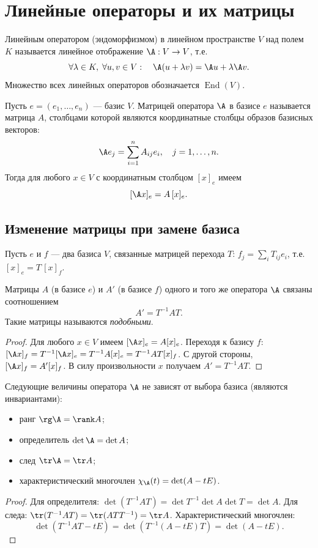 \documentclass[10pt]{article}
\begin{document}
\section{Линейные операторы и их матрицы}

\begin{definition}
    Линейным оператором (эндоморфизмом) в линейном пространстве $V$ над полем $K$ называется линейное отображение $\A: V \to V$, т.е.
    \[
    \forall \lambda\in K,\; \forall u,v\in V:\quad \A(u+\lambda v)=\A u+\lambda\A v.
    \]
    Множество всех линейных операторов обозначается $\operatorname{End}(V)$.
\end{definition}

\begin{definition}
    Пусть $e=(e_1,\dots,e_n)$ --- базис $V$. Матрицей оператора $\A$ в базисе $e$ называется матрица $A$, столбцами которой являются координатные столбцы образов базисных векторов:
    \[
    \A e_j = \sum_{i=1}^n A_{ij} e_i,\quad j=1,\dots,n.
    \]
    Тогда для любого $x\in V$ с координатным столбцом $[x]_e$ имеем
    \[
    [\A x]_e = A\,[x]_e.
    \]
\end{definition}

\subsection{Изменение матрицы при замене базиса}

Пусть $e$ и $f$ --- два базиса $V$, связанные матрицей перехода $T$: $f_j = \sum_i T_{ij} e_i$, т.е. $[x]_e = T\,[x]_f$.

\begin{theorem}
    Матрицы $A$ (в базисе $e$) и $A'$ (в базисе $f$) одного и того же оператора $\A$ связаны соотношением
    \[
    A' = T^{-1} A T.
    \]
    Такие матрицы называются \textit{подобными}.
\end{theorem}
\begin{proof}
    Для любого $x\in V$ имеем $[\A x]_e = A [x]_e$. Переходя к базису $f$:
    $[\A x]_f = T^{-1} [\A x]_e = T^{-1} A [x]_e = T^{-1} A T [x]_f$.
    С другой стороны, $[\A x]_f = A' [x]_f$. В силу произвольности $x$ получаем $A' = T^{-1} A T$.
\end{proof}

\begin{corollary}
    Следующие величины оператора $\A$ не зависят от выбора базиса (являются инвариантами):
    \begin{itemize}
        \item ранг $\rg\A = \rank A$;
        \item определитель $\det\A = \det A$;
        \item след $\tr\A = \tr A$;
        \item характеристический многочлен $\chi_\A(t) = \det(A - tE)$.
    \end{itemize}
\end{corollary}
\begin{proof}
    Для определителя: $\det(T^{-1}AT)=\det T^{-1}\det A\det T = \det A$. Для следа: $\tr(T^{-1}AT)=\tr(ATT^{-1})=\tr A$. Характеристический многочлен:
    \[
    \det(T^{-1}AT - tE) = \det(T^{-1}(A-tE)T) = \det(A-tE).
    \]
\end{proof}
\end{document}
